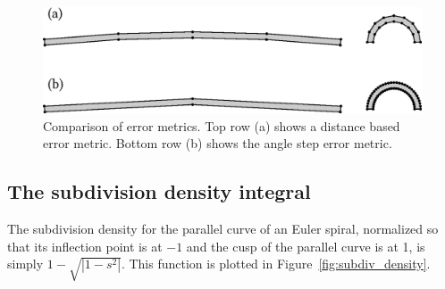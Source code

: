 \documentclass[sigconf, nonacm]{acmart}
\begin{document}
\begin{figure}
    \includegraphics[scale=0.5]{angle_err}
    \caption{Comparison of error metrics. Top row (a) shows a distance based error metric. Bottom row (b) shows the angle step error metric.}
    \label{fig:angle_err}
\end{figure}

%
%

\subsection{The subdivision density integral} \label{subsection:subdiv-density-int}

The subdivision density for the parallel curve of an Euler spiral, normalized so that its inflection point is at $-1$ and the cusp of the parallel curve is at 1, is simply $1 - \sqrt{|1-s^2|}$. This function is plotted in Figure~\ref{fig:subdiv_density}.
\end{document}

